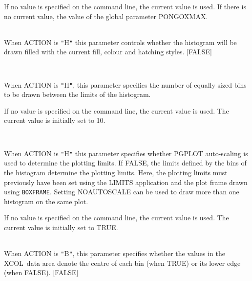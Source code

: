 \documentclass[twoside,11pt]{article}
\newcommand{\htmlref}[2]{#1}
\renewcommand{\_}{\texttt{\symbol{95}}}
\newcommand{\xcol}{{\sf XCOL}}
\newcommand{\cnam}[1]{{\tt #1}}
\newcommand{\iref} [1]{\htmlref{#1}{#1}}
\newcommand{\sstsubsection}[1]{ \item[{#1}] \mbox{} \\}
\newcommand{\sstsubsection}[1]{\item[{#1}]}
\begin{document}
{{{         If no value is specified on the command line, the current
         value is used. If there is no current value, the value of the
         global parameter PONGO\_XMAX.
      }
      \sstsubsection{
         FILL = \_LOGICAL (Read)
      }{
         When ACTION is {\tt "}H{\tt "} this parameter controls whether the
         histogram will be drawn filled with the current fill, colour
         and hatching styles.
         [FALSE]
      }
      \sstsubsection{
         NBIN = \_INTEGER (Read and Write)
      }{
         When ACTION is {\tt "}H{\tt "}, this parameter specifies the number of
         equally sized bins to be drawn between the limits of the
         histogram.

         If no value is specified on the command line, the current
         value is used. The current value is initially set to 10.
      }
      \sstsubsection{
         AUTOSCALE = \_LOGICAL (Read and Write)
      }{
         When ACTION is {\tt "}H{\tt "} this parameter specifies whether PGPLOT
         auto-scaling is used to determine the plotting limits. If
         FALSE, the limits defined by the bins of the histogram
         determine the plotting limits. Here, the plotting limits must
         previously have been set using the LIMITS application and the
         plot frame drawn using \cnam{\iref{BOXFRAME}}. Setting NOAUTOSCALE can be
         used to draw more than one histogram on the same plot.

         If no value is specified on the command line, the current
         value is used. The current value is initially set to TRUE.
      }
      \sstsubsection{
         CENTRE = \_LOGICAL (Read)
      }{
         When ACTION is {\tt "}B{\tt "}, this parameter specifies whether the
         values in the \xcol\ data area denote the centre of each bin
         (when TRUE) or its lower edge (when FALSE).
         [FALSE]
      }
   }
}
\end{document}
